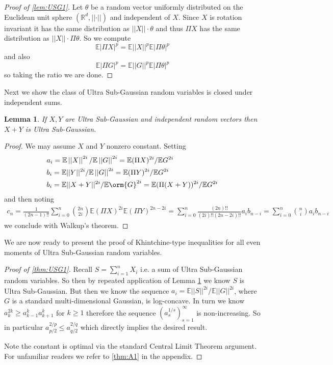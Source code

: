 \documentclass[10pt]{article}
\newcommand{\E}{\mathbb{E}}
\newcommand{\1}{\textbf{1}}
\newcommand{\R}{\mathbb{R}}
\newcommand{\norm}[1]{\left\lvert\left\lvert#1\right\rvert\right\rvert}
\newcommand{\normOne}[1]{\left\lvert#1\right\rvert}
\newtheorem{lemma}[theorem]{Lemma}
\theoremstyle{remark}
\theoremstyle{definition}
\begin{document}
\begin{proof}[Proof of \ref{lem:USG1}]
	Let $\theta$ be a random vector uniformly distributed on the Euclidean unit sphere $(\R^d,\norm{\cdot})$ and independent of $X$. Since $X$ is rotation invariant it has the same distribution as $\norm{X}\cdot \theta$ and thus $\Pi X$ has the same distribution as $\norm{X} \cdot \Pi \theta$. So we compute
	\begin{equation*}
		\E\normOne{\Pi
		 X}^p = \E \norm{X}^p \E\normOne{\Pi \theta}^p
	\end{equation*} and also
	\begin{equation*}
		\E \normOne{\Pi G}^p = \E\norm{G}^p \E\normOne{\Pi \theta}^p
	\end{equation*} so taking the ratio we are done.
\end{proof}

Next we show the class of Ultra Sub-Gaussian random variables is closed under independent sums. 

\begin{lemma}\label{lem:USG2}
	If $X,Y$ are Ultra Sub-Gaussian and  independent random vectors then $X+Y$ is Ultra Sub-Gaussian.
\end{lemma}

\begin{proof}
	We may assume $X$ and $Y$ nonzero constant. Setting
	\begin{align*}
		&a_i = \E\norm{X}^{2i}/\E\norm{G}^{2i} = \E(\Pi X)^{2i}/\E G^{2i}\\
		&b_i = \E||Y||^{2i}/\E\norm{G}^{2i} = \E(\Pi Y)^{2i}/\E G^{2i}\\
		&b_i = \E||X+Y||^{2i}/\E\orm{G}^{2i} = \E(\Pi (X+Y))^{2i}/\E G^{2i}
	\end{align*}
	and then noting
	\begin{align*}
		c_n  = \frac{1}{(2n-1)!!}\sum_{i=0}^{n}{2n \choose 2i} \E(\Pi X)^{2i} \E(\Pi Y)^{2n - 2i} = \sum_{i=0}^n \frac{(2n)!!}{(2i)!!(2n-2i)!!}a_ib_{n-i} = \sum_{i=0}^n {n \choose i}a_i b_{n-i}
	\end{align*}
	we conclude with Walkup's theorem.
\end{proof}

We are now ready to present the proof of Khintchine-type inequalities for all even moments of Ultra Sub-Gaussian random variables.

\begin{proof}[Proof of \ref{thm:USG1}]

	Recall $S = \sum_{i=1}^n X_i$ i.e. a sum of Ultra Sub-Gaussian random variables. So then by repeated application of Lemma \ref{lem:USG2} we know $S$ is Ultra Sub-Gaussian. But then we know the sequence $a_i = \E\norm{S}^{2i}/\E\norm{G}^{2i}$, where $G$ is a standard multi-dimensional Gaussian, is log-concave. In turn we know $a_k^{2k} \geq a_{k-1}^ka_{k+1}^k$ for $k \geq 1$ therefore the sequence $(a_s^{1/s})_{s=1}^{\infty}$ is non-increasing. So in particular $a_{p/2}^{2/p} \leq a_{q/2}^{2/q}$ which directly implies the desired result.

	Note the constant is optimal via the standard Central Limit Theorem argument. For unfamiliar readers we refer to \ref{thm:A1} in the appendix.
\end{proof}
\end{document}
